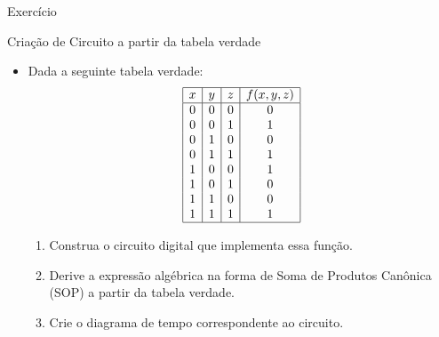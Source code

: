 \begin{frame}{Exercício}
	\par Criação de Circuito a partir da tabela verdade
	\begin{itemize}
		\item Dada a seguinte tabela verdade:
		\[
		\begin{array}{|c|c|c|c|}
			\hline
			x & y & z & f(x, y, z) \\
			\hline
			0 & 0 & 0 & 0 \\
			0 & 0 & 1 & 1 \\
			0 & 1 & 0 & 0 \\
			0 & 1 & 1 & 1 \\
			1 & 0 & 0 & 1 \\
			1 & 0 & 1 & 0 \\
			1 & 1 & 0 & 0 \\
			1 & 1 & 1 & 1 \\
			\hline
		\end{array}
		\]
		\begin{enumerate}
			\item Construa o circuito digital que implementa essa função.
			\item Derive a expressão algébrica na forma de Soma de Produtos Canônica (SOP) a partir da tabela verdade.
			\item Crie o diagrama de tempo correspondente ao circuito.
		\end{enumerate}
	\end{itemize}
\end{frame}

